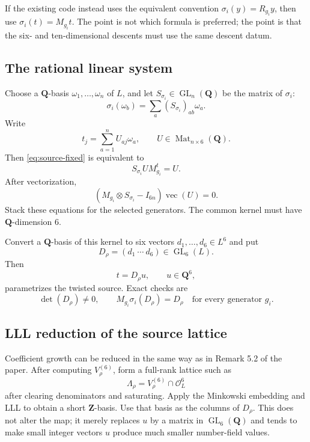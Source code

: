 \documentclass[11pt]{article}
\newcommand{\QQ}{\mathbf{Q}}
\newcommand{\ZZ}{\mathbf{Z}}
\newcommand{\Mat}{\operatorname{Mat}}
\newcommand{\cO}{\mathcal{O}}
\begin{document}
If the existing code instead uses the equivalent convention
$\sigma_i(y)=R_{g_i}y$, then use $\sigma_i(t)=M_{g_i}t$.  The point is not which
formula is preferred; the point is that the six- and ten-dimensional descents must
use the same descent datum.

\subsection{The rational linear system}

Choose a $\QQ$-basis $\omega_1,\ldots,\omega_n$ of $L$, and let
$S_{\sigma_i}\in\operatorname{GL}_n(\QQ)$ be the matrix of $\sigma_i$:
\[
  \sigma_i(\omega_b)=\sum_a(S_{\sigma_i})_{ab}\omega_a.
\]
Write
\[
  t_j=\sum_{a=1}^n U_{aj}\omega_a,
  \qquad U\in\Mat_{n\times6}(\QQ).
\]
Then \eqref{eq:source-fixed} is equivalent to
\begin{equation}
  S_{\sigma_i}U M_{g_i}^{t}=U.
  \label{eq:source-matrix-system}
\end{equation}
After vectorization,
\[
  (M_{g_i}\otimes S_{\sigma_i}-I_{6n})\operatorname{vec}(U)=0.
\]
Stack these equations for the selected generators.  The common kernel must have
$\QQ$-dimension $6$.

Convert a $\QQ$-basis of this kernel to six vectors
$d_1,\ldots,d_6\in L^6$ and put
\begin{equation}
  D_\rho=(d_1\ \cdots\ d_6)\in\operatorname{GL}_6(L).
  \label{eq:D-rho}
\end{equation}
Then
\[
  t=D_\rho u,\qquad u\in\QQ^6,
\]
parametrizes the twisted source.  Exact checks are
\[
  \det(D_\rho)\neq0,
  \qquad
  M_{g_i}\sigma_i(D_\rho)=D_\rho
  \quad\text{for every generator }g_i.
\]

\subsection{LLL reduction of the source lattice}

Coefficient growth can be reduced in the same way as in Remark 5.2 of the paper.
After computing $V_\rho^{(6)}$, form a full-rank lattice such as
\[
  \Lambda_\rho=V_\rho^{(6)}\cap\cO_L^6
\]
after clearing denominators and saturating.  Apply the Minkowski embedding and LLL
to obtain a short $\ZZ$-basis.  Use that basis as the columns of $D_\rho$.  This does
not alter the map; it merely replaces $u$ by a matrix in
$\operatorname{GL}_6(\QQ)$ and tends to make small integer vectors $u$ produce much
smaller number-field values.
\end{document}

